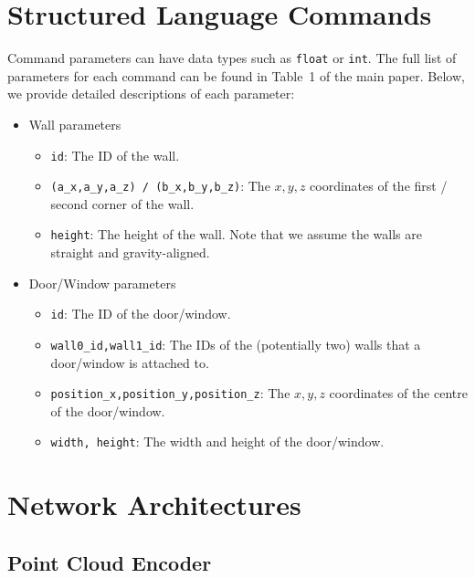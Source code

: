 \section{Structured Language Commands}
\label{sec:parameters_supp}

Command parameters can have data types such as \lstinline[style=dtypestyle]!float! or \lstinline[style=dtypestyle]!int!. The full list of parameters for each command can be found in Table~1 of the main paper. Below, we provide detailed descriptions of each parameter:


\begin{itemize}
\item Wall parameters
    \begin{itemize}
    \small
        \item \lstinline[style=cmdstyle]!id!: The ID of the wall.
        \item \lstinline[style=cmdstyle]!(a_x,a_y,a_z) / (b_x,b_y,b_z)!: The $x,y,z$ coordinates of the first / second corner of the wall.
        \item \lstinline[style=cmdstyle]!height!: The height of the wall. Note that we assume the walls are straight and gravity-aligned.
    \end{itemize}
    
\item Door/Window parameters
    \begin{itemize}
    \small
        \item \lstinline[style=cmdstyle]!id!: The ID of the door/window.
        \item \lstinline[style=cmdstyle]!wall0_id,wall1_id!: The IDs of the (potentially two) walls that a door/window is attached to.
        \item \lstinline[style=cmdstyle]!position_x,position_y,position_z!: The $x,y,z$ coordinates of the centre of the door/window.
        \item \lstinline[style=cmdstyle]!width, height!: The width and height of the door/window.
    \end{itemize}
\end{itemize}
    

\section{Network Architectures}
\label{sec:architecture}
%
\subsection{Point Cloud Encoder}
\label{subsec:point_cloud_encoder}

